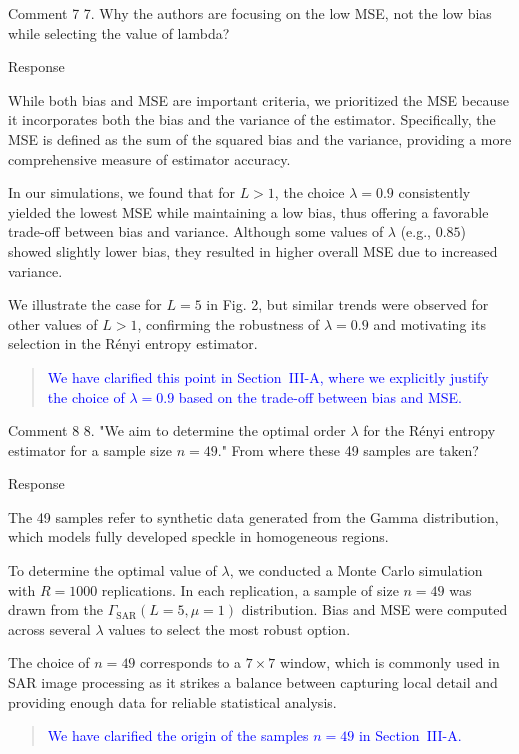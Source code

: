 \documentclass[11pt]{report}
\begin{document}
\vspace{1em} 
\begin{reviewbox}{Comment 7}
7. Why the authors are focusing on the low MSE, not the low bias while selecting the value of lambda?
\end{reviewbox}

\begin{responsebox}{Response}

While both bias and MSE are important criteria, we prioritized the MSE because it incorporates both the bias and the variance of the estimator. 
Specifically, the MSE is defined as the sum of the squared bias and the variance, providing a more comprehensive measure of estimator accuracy.

In our simulations, we found that for $L > 1$, the choice $\lambda = 0.9$ consistently yielded the lowest MSE while maintaining a low bias, thus offering a favorable trade-off between bias and variance. Although some values of $\lambda$ (e.g., $0.85$) showed slightly lower bias, they resulted in higher overall MSE due to increased variance.

We illustrate the case for $L = 5$ in Fig. 2, but similar trends were observed for other values of $L > 1$, confirming the robustness of $\lambda = 0.9$ and motivating its selection in the Rényi entropy estimator.
\begin{quote}
\textcolor{blue}{We have clarified this point in Section~III-A, where we explicitly justify the choice of $\lambda = 0.9$ based on the trade-off between bias and MSE.}
\end{quote}
\end{responsebox}

\vspace{1em}

\begin{reviewbox}{Comment 8}
8. "We aim to determine the optimal order $\lambda$ for the Rényi entropy estimator for a sample size $n=49$." From where these 49 samples are taken?
\end{reviewbox}

\begin{responsebox}{Response}


The 49 samples refer to synthetic data generated from the Gamma distribution, which models fully developed speckle in homogeneous regions.

To determine the optimal value of $\lambda$, we conducted a Monte Carlo simulation with $R = 1000$ replications.
 In each replication, a sample of size $n = 49$ was drawn from the $\Gamma_{\text{SAR}}(L = 5, \mu = 1)$ distribution. Bias and MSE were computed across several $\lambda$ values to select the most robust option.

The choice of $n = 49$ corresponds to a $7 \times 7$ window, which is commonly used in SAR image processing as it strikes a balance between capturing local detail and providing enough data for reliable statistical analysis.
\begin{quote}
\textcolor{blue}{We have clarified the origin of the samples $n = 49$ in Section~III-A.}
\end{quote}
\end{responsebox}
\end{document}
